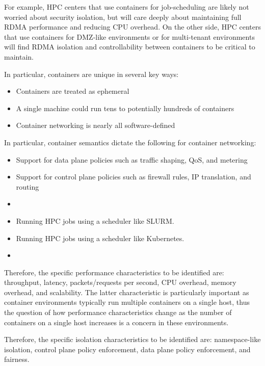 \documentclass[12pt,titlepage]{article}
\begin{document}
For example, HPC centers that use containers for job-scheduling are likely not worried about security isolation, but will care deeply about maintaining full RDMA performance and reducing CPU overhead.
On the other side, HPC centers that use containers for DMZ-like environments or for multi-tenant environments will find RDMA isolation and controllability between containers to be critical to maintain.


In particular, containers are unique in several key ways:
\begin{itemize}
   \item Containers are treated as ephemeral
   \item A single machine could run tens to potentially hundreds of containers
   \item Container networking is nearly all software-defined
\end{itemize}

In particular, container semantics dictate the following for container networking:
\begin{itemize}
   \item Support for data plane policies such as traffic shaping, QoS, and metering
   \item Support for control plane policies such as firewall rules, IP translation, and routing
   \item
\end{itemize}



\begin{itemize}
   \item Running HPC jobs using a scheduler like SLURM.
   \item Running HPC jobs using a scheduler like Kubernetes.
   \item
\end{itemize}



Therefore, the specific performance characteristics to be identified are: throughput, latency, packets/requests per second, CPU overhead, memory overhead, and scalability.
The latter characteristic is particularly important as container environments typically run multiple containers on a single host, thus the question of how performance characteristics change as the number of containers on a single host increases is a concern in these environments.

Therefore, the specific isolation characteristics to be identified are: namespace-like isolation, control plane policy enforcement, data plane policy enforcement, and fairness.
\end{document}
